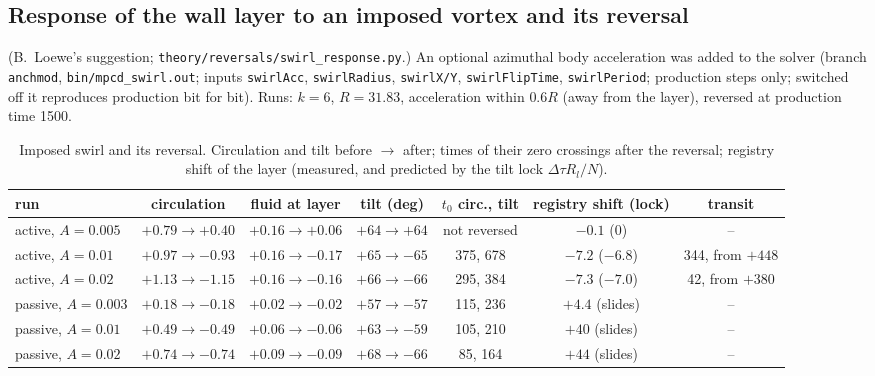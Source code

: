 \subsection{Response of the wall layer to an imposed vortex and its reversal}\label{sec:swirl}
(B.~Loewe's suggestion; \texttt{theory/reversals/swirl\_response.py}.) An optional azimuthal body acceleration was added to the solver (branch \texttt{anchmod},
\texttt{bin/mpcd\_swirl.out}; inputs \texttt{swirlAcc}, \texttt{swirlRadius}, \texttt{swirlX/Y}, \texttt{swirlFlipTime}, \texttt{swirlPeriod}; production steps only;
switched off it reproduces production bit for bit). Runs: $k=6$, $R=31.83$, acceleration within $0.6R$ (away from the layer), reversed at production time 1500.
\begin{table}[H]\centering\small
\caption{Imposed swirl and its reversal. Circulation and tilt before $\to$ after; times of their zero crossings after the reversal; registry shift of the layer
(measured, and predicted by the tilt lock $\Delta\tau R_l/N$).}\label{tab:swirl}
\begin{adjustbox}{max width=\textwidth}
\begin{tabular}{lcccccc}\toprule
run & circulation & fluid at layer & tilt (deg) & $t_0$ circ., tilt & registry shift (lock) & transit\\\midrule
active, $A=0.005$ & $+0.79\to+0.40$ & $+0.16\to+0.06$ & $+64\to+64$ & not reversed & $-0.1$ ($0$) & --\\
active, $A=0.01$ & $+0.97\to-0.93$ & $+0.16\to-0.17$ & $+65\to-65$ & 375, 678 & $-7.2$ ($-6.8$) & 344, from $+448$\\
active, $A=0.02$ & $+1.13\to-1.15$ & $+0.16\to-0.16$ & $+66\to-66$ & 295, 384 & $-7.3$ ($-7.0$) & 42, from $+380$\\
passive, $A=0.003$ & $+0.18\to-0.18$ & $+0.02\to-0.02$ & $+57\to-57$ & 115, 236 & $+4.4$ (slides) & --\\
passive, $A=0.01$ & $+0.49\to-0.49$ & $+0.06\to-0.06$ & $+63\to-59$ & 105, 210 & $+40$ (slides) & --\\
passive, $A=0.02$ & $+0.74\to-0.74$ & $+0.09\to-0.09$ & $+68\to-66$ & 85, 164 & $+44$ (slides) & --\\\bottomrule
\end{tabular}
\end{adjustbox}
\end{table}
